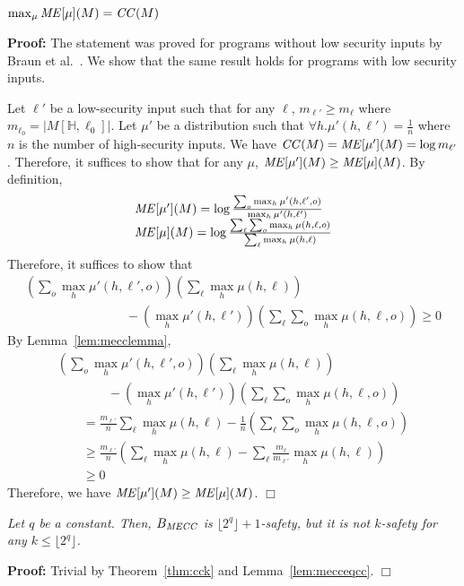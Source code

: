 \documentclass{llncs}
\newenvironment{proof}{\noindent\rm{\bf Proof:}}{\hbox{$\Box$}\vspace*{0.2\baselineskip}}
\newenvironment{reflemma}[1]{\begin{trivlist}\item[\hskip
      \labelsep{\bf Lemma #1.}]\it}{\end{trivlist}}
\newenvironment{reftheorem}[1]{\begin{trivlist}\item[\hskip
      \labelsep{\bf Theorem #1.}]\it}{\end{trivlist}}
\begin{document}
\begin{reflemma}{\ref{lem:mecceqcc}}
$\max_\mu {\it ME}[\mu](M)={\it CC}(M)$
\end{reflemma}
\begin{proof}
The statement was proved for programs without low security inputs by
Braun et al.~\cite{Braun:09:MFPS}.  We show that the same result holds
for programs with low security inputs.

Let $\ell'$ be a low-security input such that for any $\ell$,
$m_{\ell'}\ge m_\ell$ where $m_{\ell_0} = |M[\mathbb{H},\ell_0]|$.
Let $\mu'$ be a distribution such that
$\forall h.\mu'(h,\ell')=\frac{1}{n}$ where $n$ is the
number of high-security inputs.  We have ${\it CC}(M)= {\it
  ME}[\mu'](M)=\log m_{\ell'}$.  Therefore, it suffices to show that for
any $\mu$, ${\it ME}[\mu'](M)\ge{\it ME}[\mu](M)$.  By definition,
\[
\begin{array}{l}
{\it ME}[\mu'](M) = \log\frac{\sum_o\max_h \mu'(h,\ell',o)}{\max_h
  \mu'(h,\ell')}\\
{\it ME}[\mu](M) = \log\frac{\sum_\ell\sum_o\max_h
  \mu(h,\ell,o)}{\sum_\ell \max_h\mu(h,\ell)}
\end{array}
\]
Therefore, it suffices to show that
\[
\begin{array}{l}
  (\sum_o\max_h \mu'(h,\ell',o))(\sum_\ell \max_h\mu(h,\ell)) \\
\hspace{8em}-(\max_h\mu'(h,\ell'))(\sum_\ell\sum_o\max_h \mu(h,\ell,o))\ge 0
\end{array}
\]
By Lemma~\ref{lem:mecclemma},
\[
\begin{array}{l}
  (\sum_o\max_h \mu'(h,\ell',o))(\sum_\ell \max_h\mu(h,\ell))\\
\qquad\qquad-(\max_h\mu'(h,\ell'))(\sum_\ell\sum_o\max_h \mu(h,\ell,o))\\
 \qquad = \frac{m_{\ell'}}{n}\sum_\ell \max_h\mu(h,\ell)-\frac{1}{n}(\sum_\ell\sum_o\max_h \mu(h,\ell,o))\\
\qquad \ge\frac{m_{\ell'}}{n}(\sum_\ell \max_h\mu(h,\ell)-\sum_\ell \frac{m_\ell}{m_{\ell'}} \max_h\mu(h,\ell))\\
\qquad  \ge 0
\end{array}
\]
Therefore, we have ${\it ME}[\mu'](M)\ge{\it ME}[\mu](M)$.
\end{proof}

\begin{reftheorem}{\ref{thm:mecck}}
  Let $q$ be a constant.  Then, $B_{\it MECC}$ is
  $\lfloor2^q\rfloor+1$-safety, but it is not $k$-safety for any $k
  \leq \lfloor2^q\rfloor$.
\end{reftheorem}
\begin{proof}
Trivial by Theorem~\ref{thm:cck} and Lemma~\ref{lem:mecceqcc}.
\end{proof}
\end{document}
